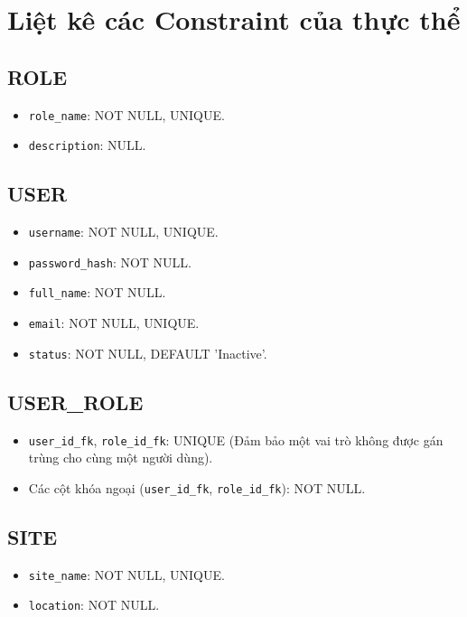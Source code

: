 \section{Liệt kê các Constraint của thực thể}

\subsection{ROLE}
\begin{itemize}
    \item \texttt{role\_name}: NOT NULL, UNIQUE.
    \item \texttt{description}: NULL.
\end{itemize}

\subsection{USER}
\begin{itemize}
    \item \texttt{username}: NOT NULL, UNIQUE.
    \item \texttt{password\_hash}: NOT NULL.
    \item \texttt{full\_name}: NOT NULL.
    \item \texttt{email}: NOT NULL, UNIQUE.
    \item \texttt{status}: NOT NULL, DEFAULT 'Inactive'.
\end{itemize}

\subsection{USER\_ROLE}
\begin{itemize}
    \item \texttt{user\_id\_fk}, \texttt{role\_id\_fk}: UNIQUE (Đảm bảo một vai trò không được gán trùng cho cùng một người dùng).
    \item Các cột khóa ngoại (\texttt{user\_id\_fk}, \texttt{role\_id\_fk}): NOT NULL.
\end{itemize}

\subsection{SITE}
\begin{itemize}
    \item \texttt{site\_name}: NOT NULL, UNIQUE.
    \item \texttt{location}: NOT NULL.
\end{itemize}

